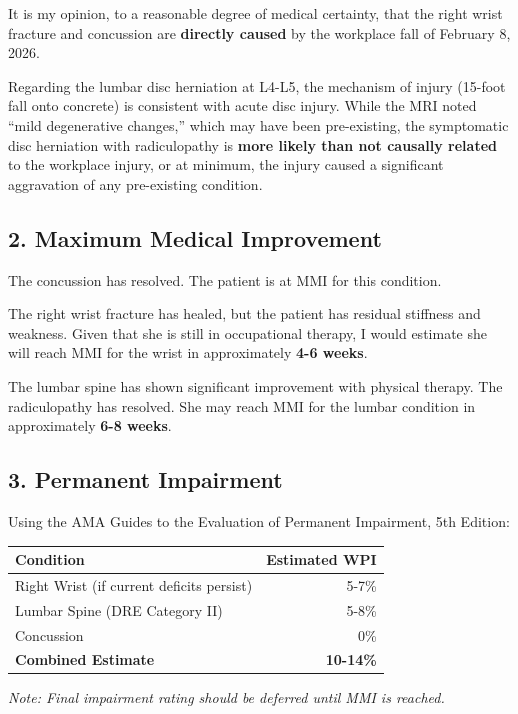 \documentclass[11pt]{article}
\begin{document}
It is my opinion, to a reasonable degree of medical certainty, that the right wrist fracture and concussion are \textbf{directly caused} by the workplace fall of February 8, 2026.

Regarding the lumbar disc herniation at L4-L5, the mechanism of injury (15-foot fall onto concrete) is consistent with acute disc injury. While the MRI noted ``mild degenerative changes,'' which may have been pre-existing, the symptomatic disc herniation with radiculopathy is \textbf{more likely than not causally related} to the workplace injury, or at minimum, the injury caused a significant aggravation of any pre-existing condition.

\subsection*{2. Maximum Medical Improvement}

The concussion has resolved. The patient is at MMI for this condition.

The right wrist fracture has healed, but the patient has residual stiffness and weakness. Given that she is still in occupational therapy, I would estimate she will reach MMI for the wrist in approximately \textbf{4-6 weeks}.

The lumbar spine has shown significant improvement with physical therapy. The radiculopathy has resolved. She may reach MMI for the lumbar condition in approximately \textbf{6-8 weeks}.

\subsection*{3. Permanent Impairment}

Using the AMA Guides to the Evaluation of Permanent Impairment, 5th Edition:

\begin{tabular}{@{}p{6cm}r@{}}
\toprule
\textbf{Condition} & \textbf{Estimated WPI} \\
\midrule
Right Wrist (if current deficits persist) & 5-7\% \\
Lumbar Spine (DRE Category II) & 5-8\% \\
Concussion & 0\% \\
\midrule
\textbf{Combined Estimate} & \textbf{10-14\%} \\
\bottomrule
\end{tabular}

\textit{Note: Final impairment rating should be deferred until MMI is reached.}
\end{document}
